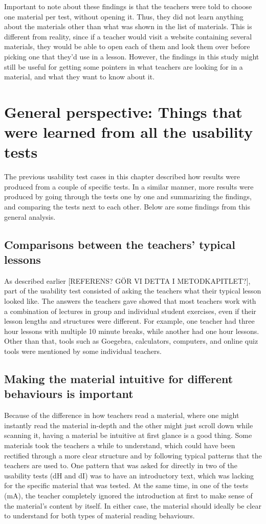 Important to note about these findings is that the teachers were told to choose one material per test, without opening it. Thus, they did not learn anything about the materials other than what was shown in the list of materials. This is different from reality, since if a teacher would visit a website containing several materials, they would be able to open each of them and look them over before picking one that they'd use in a lesson. However, the findings in this study might still be useful for getting some pointers in what teachers are looking for in a material, and what they want to know about it.

\section{General perspective: Things that were learned from all the usability tests}
The previous usability test cases in this chapter described how results were produced from a couple of specific tests. In a similar manner, more results were produced by going through the tests one by one and summarizing the findings, and comparing the tests next to each other. Below are some findings from this general analysis.

\subsection{Comparisons between the teachers' typical lessons}
As described earlier [REFERENS? GÖR VI DETTA I METODKAPITLET?], part of the usability test consisted of asking the teachers what their typical lesson looked like. The answers the teachers gave showed that most teachers work with a combination of lectures in group and individual student exercises, even if their lesson lengths and structures were different. For example, one teacher had three hour lessons with multiple 10 minute breaks, while another had one hour lessons. Other than that, tools such as Goegebra, calculators, computers, and online quiz tools were mentioned by some individual teachers.

\subsection{Making the material intuitive for different behaviours is important}
Because of the difference in how teachers read a material, where one might instantly read the material in-depth and the other might just scroll down while scanning it, having a material be intuitive at first glance is a good thing. Some materials took the teachers a while to understand, which could have been rectified through a more clear structure and by following typical patterns that the teachers are used to. One pattern that was asked for directly in two of the usability tests (dH and dI) was to have an introductory text, which was lacking for the specific material that was tested. At the same time, in one of the tests (mA), the teacher completely ignored the introduction at first to make sense of the material's content by itself. In either case, the material should ideally be clear to understand for both types of material reading behaviours.

